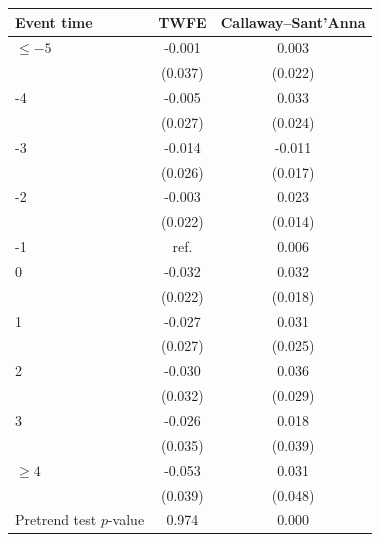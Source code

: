 \begin{tabular}{lcc}
\toprule
Event time & TWFE & Callaway--Sant'Anna \\
\midrule
\(\le -5\) & -0.001 &  0.003 \\
 & (0.037) & (0.022) \\
-4 & -0.005 &  0.033 \\
 & (0.027) & (0.024) \\
-3 & -0.014 & -0.011 \\
 & (0.026) & (0.017) \\
-2 & -0.003 &  0.023 \\
 & (0.022) & (0.014) \\
-1 & \multicolumn{1}{c}{ref.} &  0.006 \\
0 & -0.032 &  0.032 \\
 & (0.022) & (0.018) \\
1 & -0.027 &  0.031 \\
 & (0.027) & (0.025) \\
2 & -0.030 &  0.036 \\
 & (0.032) & (0.029) \\
3 & -0.026 &  0.018 \\
 & (0.035) & (0.039) \\
\(\ge 4\) & -0.053 &  0.031 \\
 & (0.039) & (0.048) \\
\midrule
Pretrend test \(p\)-value & 0.974 & 0.000 \\
\bottomrule
\end{tabular}

